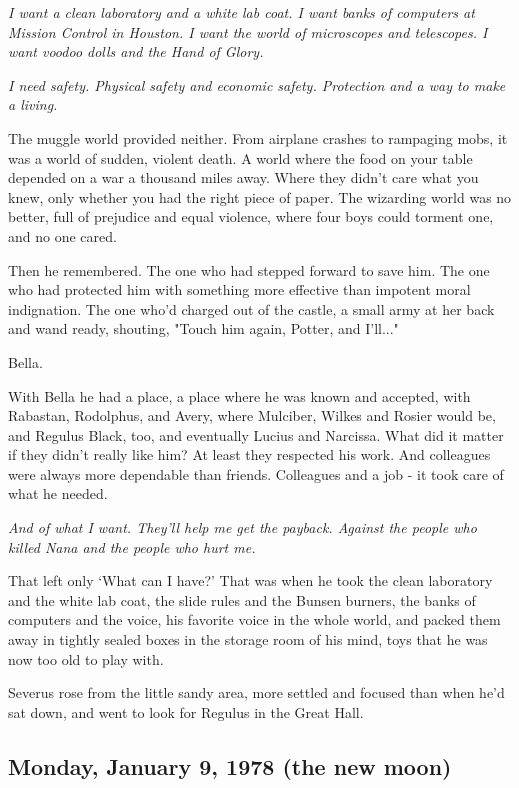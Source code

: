 \emph{I want a clean laboratory and a white lab coat. I want banks of computers at Mission Control in Houston. I want the world of microscopes and telescopes. I want voodoo dolls and the Hand of Glory.}

\emph{I need safety. Physical safety and economic safety. Protection and a way to make a living.}

The muggle world provided neither. From airplane crashes to rampaging mobs, it was a world of sudden, violent death. A world where the food on your table depended on a war a thousand miles away. Where they didn't care what you knew, only whether you had the right piece of paper. The wizarding world was no better, full of prejudice and equal violence, where four boys could torment one, and no one cared.

Then he remembered. The one who had stepped forward to save him. The one who had protected him with something more effective than impotent moral indignation. The one who'd charged out of the castle, a small army at her back and wand ready, shouting, "Touch him again, Potter, and I'll..."

Bella.

With Bella he had a place, a place where he was known and accepted, with Rabastan, Rodolphus, and Avery, where Mulciber, Wilkes and Rosier would be, and Regulus Black, too, and eventually Lucius and Narcissa. What did it matter if they didn't really like him? At least they respected his work. And colleagues were always more dependable than friends. Colleagues and a job - it took care of what he needed.

\emph{And of what I want. They'll help me get the payback. Against the people who killed Nana and the people who hurt me.}

That left only `What can I have?' That was when he took the clean laboratory and the white lab coat, the slide rules and the Bunsen burners, the banks of computers and the voice, his favorite voice in the whole world, and packed them away in tightly sealed boxes in the storage room of his mind, toys that he was now too old to play with.

Severus rose from the little sandy area, more settled and focused than when he'd sat down, and went to look for Regulus in the Great Hall.


\subsection{Monday, January 9, 1978 (the new moon)}

